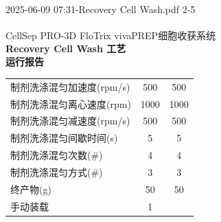 \documentclass[UTF8,10pt,a4paper,fontset=fandol]{ctexart}
\newcommand{\fieldvalue}[1]{#1}
\begin{document}
\vfill

\begin{center}
\small 2025-06-09 07:31-Recovery Cell Wash.pdf \hfill 2-5
\end{center}

\newpage

\begin{center}
CellSep\textsuperscript{\textregistered} PRO-3D FloTrix\textsuperscript{\textregistered} vivaPREP细胞收获系统\\
\textbf{Recovery Cell Wash 工艺}\\
\textbf{运行报告}
\end{center}

\begin{tabularx}{\textwidth}{@{}>{\raggedright\arraybackslash}Xcc@{}}
制剂洗涤混匀加速度(rpm/s) &
\fieldvalue{500} &
\fieldvalue{500} \\
制剂洗涤混匀离心速度(rpm) &
\fieldvalue{1000} &
\fieldvalue{1000} \\
制剂洗涤混匀减速度(rpm/s) &
\fieldvalue{500} &
\fieldvalue{500} \\
制剂洗涤混匀间歇时间(s) &
\fieldvalue{5} &
\fieldvalue{5} \\
制剂洗涤混匀次数(\#) &
\fieldvalue{4} &
\fieldvalue{4} \\
制剂洗涤混匀方式(\#) &
\fieldvalue{3} &
\fieldvalue{3} \\
终产物(g) &
\fieldvalue{50} &
\fieldvalue{50} \\
手动装载 &
\fieldvalue{1} &

\end{tabularx}
\end{document}
